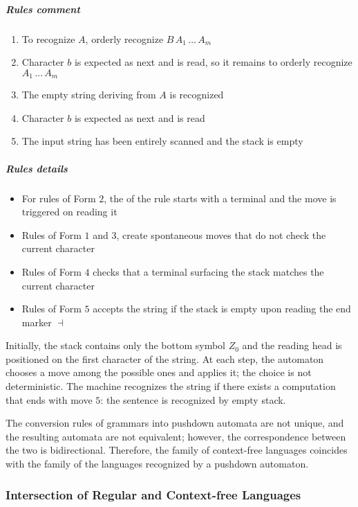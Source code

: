 \documentclass[english]{article}
\begin{document}
\subparagraph*{Rules comment}

\begin{enumerate}[label=\#\arabic*., labelindent=1em, leftmargin=*, widest*=3]
  \item To recognize \(A\), orderly recognize \(B \, A_1 \,\ldots\, A_m\)
  \item Character \(b\) is expected as next and is read, so it remains to orderly recognize \(A_1 \,\ldots\, A_m\)
  \item The empty string deriving from \(A\) is recognized
  \item Character \(b\) is expected as next and is read
  \item The input string has been entirely scanned and the stack is empty
\end{enumerate}

\subparagraph*{Rules details}

\begin{itemize}
  \item For rules of Form \(2\), the \RP of the rule starts with a terminal and the move is triggered on reading it
  \item Rules of Form \(1\) and \(3\), create spontaneous moves that do not check the current character
  \item Rules of Form \(4\) checks that a terminal surfacing the stack matches the current character
  \item Rules of Form \(5\) accepts the string if the stack is empty upon reading the end marker \(\dashv\)
\end{itemize}

Initially, the stack contains only the bottom symbol \(Z_0\) and the reading head is positioned on the first character of the string.
At each step, the automaton chooses a move among the possible ones and applies it; the choice is not deterministic.
The machine recognizes the string if there exists a computation that ends with move \(5\): the sentence is recognized by empty stack.

The conversion rules of grammars into pushdown automata are not unique, and the resulting automata are not equivalent;
however, the correspondence between the two is bidirectional.
Therefore, the family of context-free languages \CF coincides with the family of the languages recognized by a pushdown automaton.

\subsubsection{Intersection of Regular and Context-free Languages}
\label{sec:intersection-of-regular-and-context-free-languages}
\end{document}

